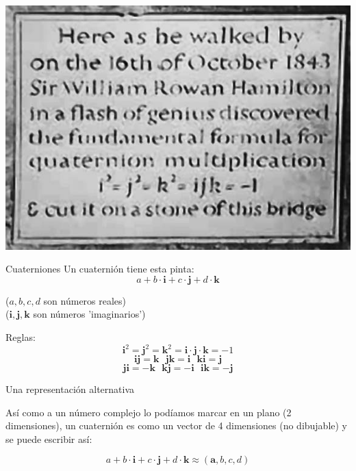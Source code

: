 \documentclass[10pt]{beamer}
\begin{document}
\begin{frame}

\includegraphics[scale=0.7]{images/hamilton.png}

\end{frame}

\begin{frame}{Cuaterniones}
Un cuaternión tiene esta pinta:
$$a +b\cdot \textbf{i} + c \cdot \textbf{j} + d \cdot \textbf{k}$$

	($a,b,c,d$ son números reales)  \\
	($\textbf{i},\textbf{j},\textbf{k}$ son números 'imaginarios')  \newline
	
	

\center	Reglas:
	$$\textbf{i}^2 = \textbf{j}^2 = \textbf{k}^2 = \textbf{i}\cdot\textbf{j}\cdot\textbf{k} = -1$$ \pause 	
	$$\textbf{ij}=\textbf{k}\ \ \ \textbf{jk}=\textbf{i}\ \ \ \textbf{ki}=\textbf{j}$$
	$$\textbf{ji}=-\textbf{k}\ \ \ \textbf{kj}=-\textbf{i}\ \ \ \textbf{ik}=-\textbf{j}$$ \pause
	
\end{frame}

\begin{frame}{Una representación alternativa}

Así como a un número complejo lo podíamos marcar en un plano (2 dimensiones), un cuaternión es como un vector de 4 dimensiones (no dibujable) y se puede escribir así:

$$a +b\cdot \textbf{i} + c \cdot \textbf{j} + d \cdot \textbf{k} \approx (\textbf{a},b,c,d)$$



\end{frame}
\end{document}

